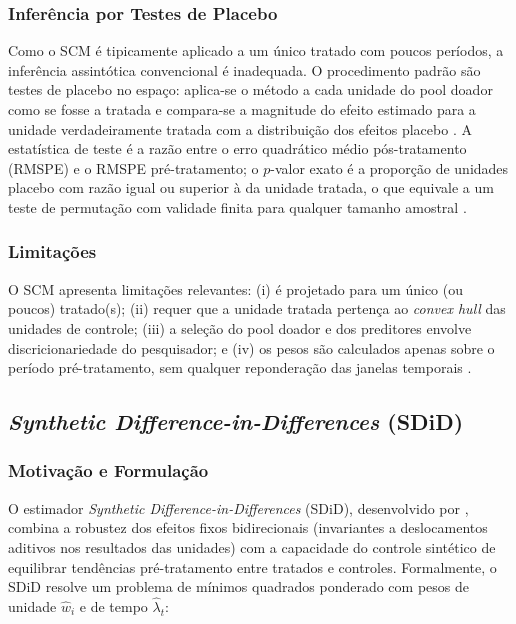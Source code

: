 \documentclass[a4paper,12pt]{article}
\begin{document}
\subsubsection{Inferência por Testes de Placebo}

Como o SCM é tipicamente aplicado a um único tratado com poucos períodos, a inferência
assintótica convencional é inadequada. O procedimento padrão são testes de placebo no
espaço: aplica-se o método a cada unidade do pool doador como se fosse a tratada e
compara-se a magnitude do efeito estimado para a unidade verdadeiramente tratada com a
distribuição dos efeitos placebo \cite{abadie2003, abadie2010}. A estatística de teste é a
razão entre o erro quadrático médio pós-tratamento (RMSPE) e o RMSPE pré-tratamento; o
$p$-valor exato é a proporção de unidades placebo com razão igual ou superior à da
unidade tratada, o que equivale a um teste de permutação com validade finita para
qualquer tamanho amostral \cite{abadie2021}.

\subsubsection{Limitações}

O SCM apresenta limitações relevantes: (i) é projetado para um único (ou poucos)
tratado(s); (ii) requer que a unidade tratada pertença ao \textit{convex hull} das unidades
de controle; (iii) a seleção do pool doador e dos preditores envolve
discricionariedade do pesquisador; e (iv) os pesos são calculados apenas sobre o período
pré-tratamento, sem qualquer reponderação das janelas temporais
\cite{arkhangelsky2021}.

\subsection{\textit{Synthetic Difference-in-Differences} (SDiD)}

\subsubsection{Motivação e Formulação}

O estimador \textit{Synthetic Difference-in-Differences} (SDiD), desenvolvido por
, combina a robustez dos efeitos fixos bidirecionais
(invariantes a deslocamentos aditivos nos resultados das unidades) com a capacidade do
controle sintético de equilibrar tendências pré-tratamento entre tratados e controles.
Formalmente, o SDiD resolve um problema de mínimos quadrados ponderado com pesos de
unidade $\hat{w}_i$ e de tempo $\hat{\lambda}_t$:
\end{document}
